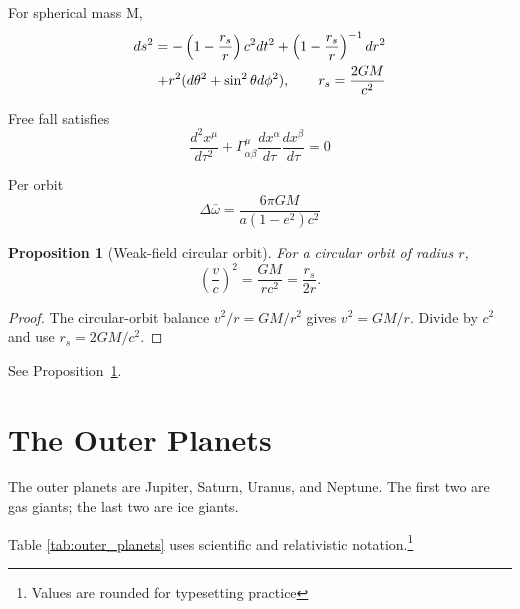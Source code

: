 \documentclass{article}
\newtheorem{proposition}{Proposition}
\begin{document}
For spherical mass M,
\begin{equation}
\begin{split}
    ds^2 = - \left( 1 - \frac{r_s}{r} \right) c^2 dt^2 + \left( 1 - \frac{r_s}{r} \right)^{-1} dr^2 \\
    + r^2(d\theta ^2 + \sin ^2 \theta d\phi ^2 ), \hspace{20px} r_s = \frac{2GM}{c^2}
\end{split}
\end{equation}

Free fall satisfies
\begin{equation}
    \frac{d^2 x^\mu}{d\tau ^2} + \Gamma_{\alpha \beta}^{\mu}\frac{dx^\alpha}{d\tau}\frac{dx^\beta}{d\tau} = 0
\end{equation}

Per orbit
\begin{equation}
    \Delta \bar{\omega} = \frac{6\pi GM}{a(1-e^2)c^2} 
\end{equation}
\begin{proposition}[Weak-field circular orbit]
\label{prop:circular}
For a circular orbit of radius $r$,
\begin{equation}
\left( \frac{v}{c} \right)^2 = \frac{GM}{rc^2} = \frac{r_s}{2r}.
\end{equation}
\end{proposition}

\begin{proof}
The circular-orbit balance $v^2/r = GM/r^2$ gives $v^2 = GM/r$. Divide by
$c^2$ and use $r_s = 2GM/c^2$.
\end{proof}

See Proposition~\ref{prop:circular}.
\section{The Outer Planets}
The outer planets are Jupiter, Saturn, Uranus, and Neptune\cite{nasa_temperatures}. The first two
are gas giants; the last two are ice giants.

Table \ref{tab:outer_planets} uses scientific and relativistic notation.\footnote{Values are rounded for typesetting practice}
\end{document}
